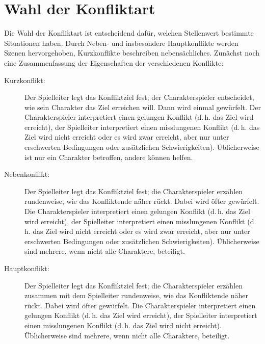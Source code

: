\section{Wahl der Konfliktart}
Die Wahl der Konfliktart ist entscheidend dafür, welchen Stellenwert bestimmte Situationen haben. Durch Neben- und insbesondere Hauptkonflikte werden Szenen hervorgehoben, Kurzkonflikte  beschreiben nebensächliches. Zunächst noch eine Zusammenfassung der Eigenschaften der verschiedenen Konflikte:
\begin{description}
	\item[Kurzkonflikt:] Der Spielleiter legt das Konfliktziel fest; der Charakterspieler entscheidet, wie sein Charakter das Ziel erreichen will. Dann wird einmal gewürfelt. Der Charakterspieler interpretiert einen gelungen Konflikt (d.\,h. das Ziel wird erreicht), der Spielleiter interpretiert einen misslungenen Konflikt (d.\,h. das Ziel wird nicht erreicht oder es wird zwar erreicht, aber nur unter erschwerten Bedingungen oder zusätzlichen Schwierigkeiten). Üblicherweise ist nur ein Charakter betroffen, andere können helfen.
	
	\item[Nebenkonflikt:] Der Spielleiter legt das Konfliktziel fest; die Charakterspieler erzählen rundenweise, wie das Konfliktende näher rückt. Dabei wird öfter gewürfelt. Die Charakterspieler interpretiert einen gelungen Konflikt (d.\,h. das Ziel wird erreicht), der Spielleiter interpretiert einen misslungenen Konflikt (d.\,h. das Ziel wird nicht erreicht oder es wird zwar erreicht, aber nur unter erschwerten Bedingungen oder zusätzlichen Schwierigkeiten). Üblicherweise sind mehrere, wenn nicht alle Charaktere, beteiligt.
	
	\item[Hauptkonflikt:] Der Spielleiter legt das Konfliktziel fest; die Charakterspieler erzählen zusammen mit dem Spielleiter rundenweise, wie das Konfliktende näher rückt. Dabei wird öfter gewürfelt. Die Charakterspieler interpretiert einen gelungen Konflikt (d.\,h. das Ziel wird erreicht), der Spielleiter interpretiert einen misslungenen Konflikt (d.\,h. das Ziel wird nicht erreicht). Üblicherweise sind mehrere, wenn nicht alle Charaktere, beteiligt.
\end{description}


